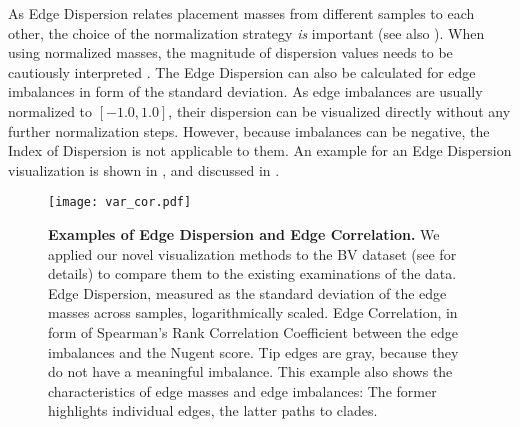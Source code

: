As Edge Dispersion relates placement masses from different samples to each other,
the choice of the normalization strategy {\em is} important
(see also ).
When using normalized masses, the magnitude of dispersion values needs to be cautiously interpreted \cite{Lovell2015}.
The Edge Dispersion can also be calculated for edge imbalances in form of the standard deviation.
As edge imbalances are usually normalized to $[ -1.0, 1.0 ]$,
their dispersion can be visualized directly without any further normalization steps.
However, because imbalances can be negative, the Index of Dispersion is not applicable to them.
An example for an Edge Dispersion visualization is shown in ,
and discussed in .

\begin{figure}[!ht]
    \centering
    \texttt{[image: var\_cor.pdf]}
    \begin{subfigure}{0pt}
        \label{fig:var_cor:sub:em_varl}
    \end{subfigure}
    \begin{subfigure}{0pt}
        \label{fig:var_cor:sub:ei_var}
    \end{subfigure}
    \caption[Examples of Edge Dispersion and Edge Correlation]{
        \textbf{Examples of Edge Dispersion and Edge Correlation.}
        We applied our novel visualization methods to the \acf{BV} dataset
        (see  for details)
        to compare them to the existing examinations of the data.
        Edge Dispersion, measured as the standard deviation of the edge masses across samples, logarithmically scaled.
        Edge Correlation, in form of Spearman's Rank Correlation Coefficient
        between the edge imbalances and the Nugent score.
        Tip edges are gray, because they do not have a meaningful imbalance.
        This example also shows the characteristics of edge masses and edge imbalances:
        The former highlights individual edges, the latter paths to clades.
    }
    \label{fig:var_cor}
\end{figure}

